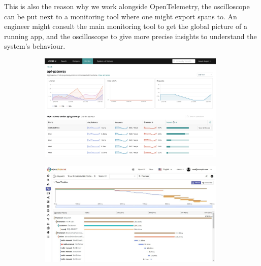         This is also the reason why we work alongside OpenTelemetry, the oscilloscope can be put next to a monitoring tool where one might export spans to. An engineer might consult the main monitoring tool to get the global picture of a running app, and the oscilloscope to give more precise insights to understand the system's behaviour. 
       \begin{figure}[H]
            \centering
            \begin{subfigure}{.5\textwidth}
                \centering
                \includegraphics[width=0.98\textwidth]{img/jaeger.png}
                \label{fig:sub1}
            \end{subfigure}%
            \begin{subfigure}{.5\textwidth}
                \centering
                \includegraphics[width =0.98\textwidth]{img/jaeger2.jpg}
                \label{fig:sub2}
            \end{subfigure}
            \label{fig:test}
            \end{figure}

